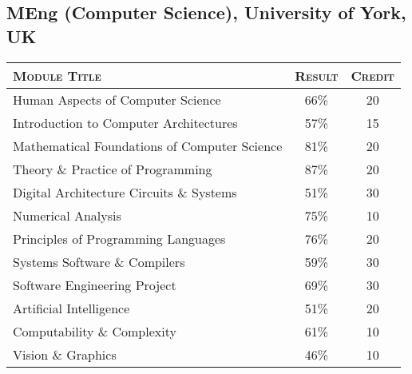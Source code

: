 \documentclass[a4paper,10pt]{article}
\newcommand{\detail}[2]{\hypertarget{details:#1}{\subsection{#2}}}
\begin{document}
\detail{csyork}{MEng (Computer Science), University of York, UK}
\begin{tabular}{p{11cm}|c|c}
  \hline
  \textsc{Module Title}                        & \textsc{Result} & \textsc{Credit}\\
  \hline

  Human Aspects of Computer Science            & 66\%            & 20\\
  Introduction to Computer Architectures       & 57\%            & 15\\
  Mathematical Foundations of Computer Science & 81\%            & 20\\
  Theory \& Practice of Programming            & 87\%            & 20\\
  Digital Architecture Circuits \& Systems     & 51\%            & 30\\
  Numerical Analysis                           & 75\%            & 10\\
  Principles of Programming Languages          & 76\%            & 20\\
  Systems Software \& Compilers                & 59\%            & 30\\
  Software Engineering Project                 & 69\%            & 30\\
  Artificial Intelligence                      & 51\%            & 20\\
  Computability \& Complexity                  & 61\%            & 10\\
  Vision \& Graphics                           & 46\%            & 10\\
\end{tabular}
\end{document}
